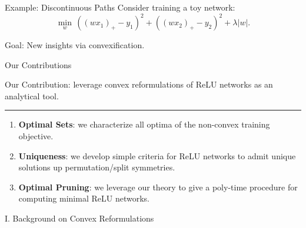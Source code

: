 \documentclass[usenames,dvipsnames,mathserif,notheorems]{beamer}
\newcommand{\horizontalrule}{
	{
			\vspace{-0.5em}
			\center \rule{\textwidth}{0.1em}
			\vspace{-0.2em}
		}
}
\newcommand{\good}[1]{\textcolor{good}{#1}}
\begin{document}
\begin{frame}{Example: Discontinuous Paths}
	Consider training a toy network:
	\[
		\min_{w} \, ((w x_1)_+ - y_1)^2 + ((w x_2)_+ - y_2)^2 + \lambda |w|.
	\]

	\begin{center}
		
	\end{center}

	\pause

	\begin{center}
		\Large
		\good{Goal}: New insights via convexification.
	\end{center}

\end{frame}

\begin{frame}{Our Contributions}

	{
		\large \good{Our Contribution}: leverage convex reformulations
		of ReLU networks \citep{pilanci2020convex} as an analytical tool.
	}

	\pause
	\vspace{0.5em}
	\horizontalrule
	\vspace{0.5em}

	\begin{enumerate}
		\item \textbf{Optimal Sets}: we characterize all optima of the
		      non-convex training objective.\pause
		      \vspace{0.5em}

		\item \textbf{Uniqueness}: we develop simple criteria for ReLU networks
		      to admit unique solutions up permutation/split symmetries. \pause
		      \vspace{0.5em}

		\item \textbf{Optimal Pruning}: we leverage our theory to give a
		      poly-time procedure for computing minimal ReLU networks.
	\end{enumerate}

\end{frame}


\begin{frame}{}
	\begin{center}
		\huge I. Background on Convex Reformulations
	\end{center}
\end{frame}
\end{document}

